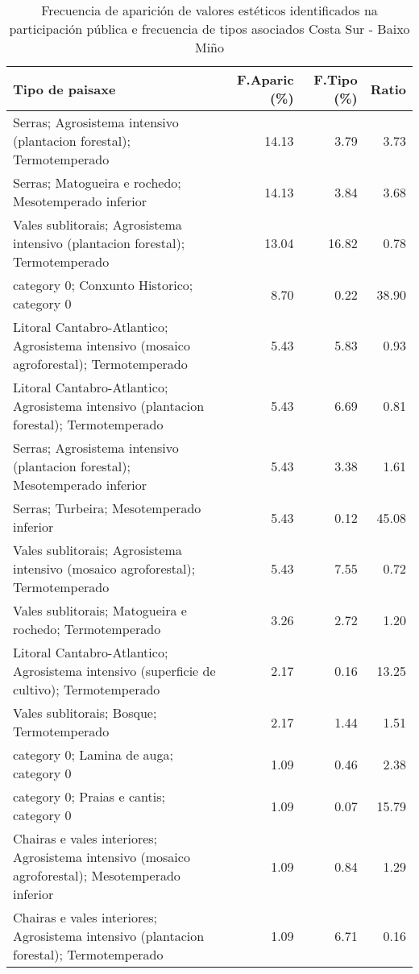 \begin{table}[p]
\centering
\caption{Frecuencia de aparición de valores estéticos identificados na participación pública e frecuencia de tipos asociados Costa Sur - Baixo Miño} 
\label{vsixotest3}
\begin{tabular}{lrrr}
  \hline
Tipo de paisaxe & F.Aparic (\%) & F.Tipo (\%) & Ratio \\ 
  \hline
Serras; Agrosistema intensivo (plantacion forestal); Termotemperado & 14.13 & 3.79 & 3.73 \\ 
  Serras; Matogueira e rochedo; Mesotemperado inferior & 14.13 & 3.84 & 3.68 \\ 
  Vales sublitorais; Agrosistema intensivo (plantacion forestal); Termotemperado & 13.04 & 16.82 & 0.78 \\ 
  category 0; Conxunto Historico; category 0 & 8.70 & 0.22 & 38.90 \\ 
  Litoral Cantabro-Atlantico; Agrosistema intensivo (mosaico agroforestal); Termotemperado & 5.43 & 5.83 & 0.93 \\ 
  Litoral Cantabro-Atlantico; Agrosistema intensivo (plantacion forestal); Termotemperado & 5.43 & 6.69 & 0.81 \\ 
  Serras; Agrosistema intensivo (plantacion forestal); Mesotemperado inferior & 5.43 & 3.38 & 1.61 \\ 
  Serras; Turbeira; Mesotemperado inferior & 5.43 & 0.12 & 45.08 \\ 
  Vales sublitorais; Agrosistema intensivo (mosaico agroforestal); Termotemperado & 5.43 & 7.55 & 0.72 \\ 
  Vales sublitorais; Matogueira e rochedo; Termotemperado & 3.26 & 2.72 & 1.20 \\ 
  Litoral Cantabro-Atlantico; Agrosistema intensivo (superficie de cultivo); Termotemperado & 2.17 & 0.16 & 13.25 \\ 
  Vales sublitorais; Bosque; Termotemperado & 2.17 & 1.44 & 1.51 \\ 
  category 0; Lamina de auga; category 0 & 1.09 & 0.46 & 2.38 \\ 
  category 0; Praias e cantis; category 0 & 1.09 & 0.07 & 15.79 \\ 
  Chairas e vales interiores; Agrosistema intensivo (mosaico agroforestal); Mesotemperado inferior & 1.09 & 0.84 & 1.29 \\ 
  Chairas e vales interiores; Agrosistema intensivo (plantacion forestal); Termotemperado & 1.09 & 6.71 & 0.16 \\ 

\end{tabular}
\end{table}
